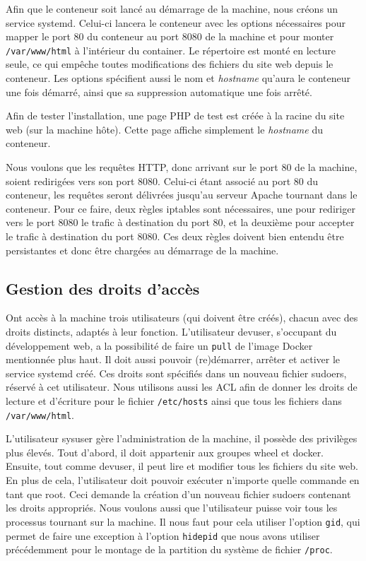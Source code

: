 \documentclass{extarticle} %
\begin{document}
     Afin que le conteneur soit lancé au démarrage de la machine, nous créons un service systemd. 
     Celui-ci lancera le conteneur avec les options nécessaires pour mapper le port 80 du conteneur 
     au port 8080 de la machine et pour monter \texttt{/var/www/html} à l'intérieur du container. 
     Le répertoire est monté en lecture seule, ce qui empêche toutes modifications des fichiers 
     du site web depuis le conteneur. Les options spécifient aussi le nom et \textit{hostname} 
     qu'aura le conteneur une fois démarré, ainsi que sa suppression automatique une fois arrêté.

     Afin de tester l'installation, une page PHP de test est créée à la racine du site web (sur 
     la machine hôte). Cette page affiche simplement le \textit{hostname} du conteneur.

     Nous voulons que les requêtes HTTP, donc arrivant sur le port 80 de la machine, soient 
     redirigées vers son port 8080. Celui-ci étant associé au port 80 du conteneur, les 
     requêtes seront délivrées jusqu'au serveur Apache tournant dans le conteneur. Pour 
     ce faire, deux règles iptables sont nécessaires, une pour rediriger vers le port 8080 
     le trafic à destination du port 80, et la deuxième pour accepter le trafic à destination 
     du port 8080. Ces deux règles doivent bien entendu être persistantes et donc être chargées 
     au démarrage de la machine.

     \subsection{Gestion des droits d'accès}

     Ont accès à la machine trois utilisateurs (qui doivent être créés), chacun avec des 
     droits distincts, adaptés à leur fonction. L'utilisateur devuser, s'occupant du 
     développement web, a la possibilité de faire un \texttt{pull} de l'image Docker 
     mentionnée plus haut. Il doit aussi pouvoir (re)démarrer, arrêter et activer le service 
     systemd créé. Ces droits sont spécifiés dans un nouveau fichier sudoers, réservé à cet 
     utilisateur. Nous utilisons aussi les ACL afin de donner les droits de lecture et d'écriture  
     pour le fichier \texttt{/etc/hosts} ainsi que tous les fichiers dans \texttt{/var/www/html}.

     L'utilisateur sysuser gère l'administration de la machine, il possède des privilèges plus élevés. 
     Tout d'abord, il doit appartenir aux groupes wheel et docker. Ensuite, tout comme devuser, il 
     peut lire et modifier tous les fichiers du site web. En plus de cela, l'utilisateur doit pouvoir 
     exécuter n'importe quelle commande en tant que root. Ceci demande la création d'un nouveau fichier 
     sudoers contenant les droits appropriés. Nous voulons aussi que l'utilisateur puisse voir tous les 
     processus tournant sur la machine. Il nous faut pour cela utiliser l'option \texttt{gid}, qui permet 
     de faire une exception à l'option \texttt{hidepid} que nous avons utiliser précédemment pour le 
     montage de la partition du système de fichier \texttt{/proc}.
\end{document}
